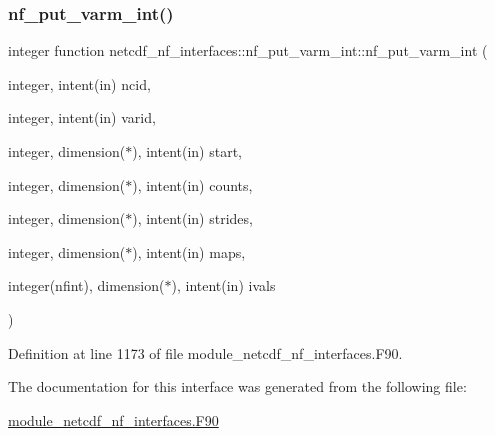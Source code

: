 \subsubsection{\texorpdfstring{nf\+\_\+put\+\_\+varm\+\_\+int()}{nf\_put\_varm\_int()}}
{\footnotesize\ttfamily integer function netcdf\+\_\+nf\+\_\+interfaces\+::nf\+\_\+put\+\_\+varm\+\_\+int\+::nf\+\_\+put\+\_\+varm\+\_\+int (\begin{DoxyParamCaption}\item[{integer, intent(in)}]{ncid,  }\item[{integer, intent(in)}]{varid,  }\item[{integer, dimension($\ast$), intent(in)}]{start,  }\item[{integer, dimension($\ast$), intent(in)}]{counts,  }\item[{integer, dimension($\ast$), intent(in)}]{strides,  }\item[{integer, dimension($\ast$), intent(in)}]{maps,  }\item[{integer(nfint), dimension($\ast$), intent(in)}]{ivals }\end{DoxyParamCaption})}



Definition at line 1173 of file module\+\_\+netcdf\+\_\+nf\+\_\+interfaces.\+F90.



The documentation for this interface was generated from the following file\+:\begin{DoxyCompactItemize}
\item 
\hyperlink{module__netcdf__nf__interfaces_8F90}{module\+\_\+netcdf\+\_\+nf\+\_\+interfaces.\+F90}\end{DoxyCompactItemize}
